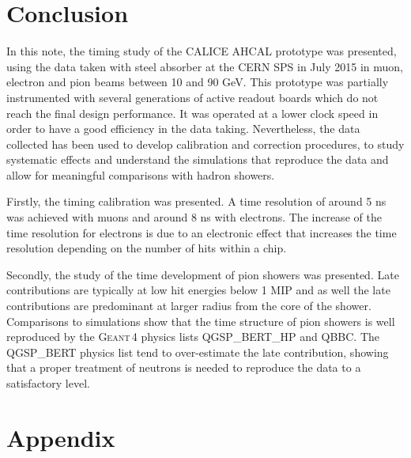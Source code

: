 \documentclass{JINST}
\newcommand\geant{\textsc{Geant\,4}\xspace}
\begin{document}
\section{Conclusion}

In this note, the timing study of the CALICE AHCAL prototype was presented, using the data taken with steel absorber at the CERN SPS in July 2015 in muon, electron and pion beams between 10 and 90 GeV. This prototype was partially instrumented with several generations of active readout boards which do not reach the final design performance. It was operated at a lower clock speed in order to have a good efficiency in the data taking. Nevertheless, the data collected has been used to develop calibration and correction procedures, to study systematic effects and understand the simulations that reproduce the data and allow for meaningful comparisons with hadron showers.

Firstly, the timing calibration was presented. A time resolution of around 5 ns was achieved with muons and around 8 ns with electrons. The increase of the time resolution for electrons is due to an electronic effect that increases the time resolution depending on the number of hits within a chip.

Secondly, the study of the time development of pion showers was presented. Late contributions are typically at low hit energies below 1 MIP and as well the late contributions are predominant at larger radius from the core of the shower. Comparisons to simulations show that the time structure of pion showers is well reproduced by the \geant physics lists QGSP\_BERT\_HP and QBBC. The QGSP\_BERT physics list tend to over-estimate the late contribution, showing that a proper treatment of neutrons is needed to reproduce the data to a satisfactory level.




% 

\clearpage

\appendix
\section{Appendix}
\label{appendix:Additional}
\end{document}
